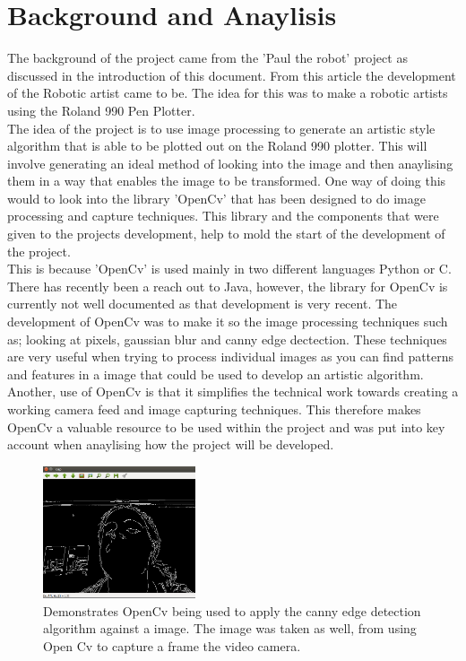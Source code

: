 \documentclass{article}
\begin{document}
	\clearpage
	\section{Background and Anaylisis}
The background of the project came from the 'Paul the robot' project\cite{Paul_the_robot} as discussed in the introduction of this document. From this article the development of the Robotic artist came to be. The idea for this was to make a robotic artists using the Roland 990 Pen Plotter.\\ \newline
The idea of the project is to use image processing to generate an artistic style algorithm that is able to be plotted out on the Roland 990 plotter. This will involve generating an ideal method of looking into the image and then anaylising them in a way that enables the image to be transformed. One way of doing this would to look into the library 'OpenCv' that has been designed to do image processing and capture techniques. This library and the components that were given to the projects development, help to mold the start of the development of the project.\\ \newline
This is because 'OpenCv'\cite{OpenCv} is used mainly in two different languages Python or C. There has recently been a reach out to Java, however, the library for OpenCv is currently not well documented as that development is very recent. The development of OpenCv was to make it so the image processing techniques such as; looking at pixels, gaussian blur and canny edge dectection. These techniques are very useful when trying to process individual images as you can find patterns and features in a image that could be used to develop an artistic algorithm. Another, use of OpenCv is that it simplifies the technical work towards creating a working camera feed and image capturing techniques. This therefore makes OpenCv a valuable resource to be used within the project and was put into key account when anaylising how the project will be developed. \\ \newline
   
   \begin{figure}[h]
    \centering
    \includegraphics[width=0.4\textwidth]{canny_edge_example.png}
    \caption{Demonstrates OpenCv\cite{OpenCv} being used to apply the canny edge detection algorithm against a image. The image was taken as well, from using Open Cv to capture a frame the video camera.}
    \label{fig:canny_edge_detection}
	\end{figure}
\end{document}
